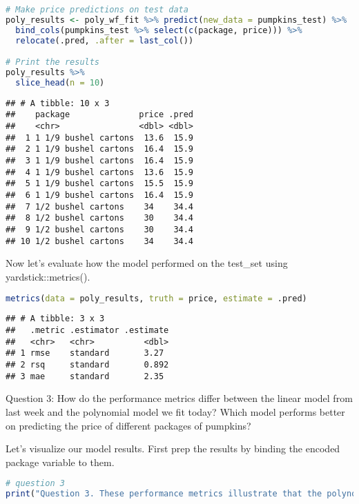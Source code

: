 \documentclass[
]{article}
\begin{document}
\begin{lstlisting}[language=R]
# Make price predictions on test data
poly_results <- poly_wf_fit %>% predict(new_data = pumpkins_test) %>% 
  bind_cols(pumpkins_test %>% select(c(package, price))) %>% 
  relocate(.pred, .after = last_col())

# Print the results
poly_results %>% 
  slice_head(n = 10)
\end{lstlisting}

\begin{lstlisting}
## # A tibble: 10 x 3
##    package              price .pred
##    <chr>                <dbl> <dbl>
##  1 1 1/9 bushel cartons  13.6  15.9
##  2 1 1/9 bushel cartons  16.4  15.9
##  3 1 1/9 bushel cartons  16.4  15.9
##  4 1 1/9 bushel cartons  13.6  15.9
##  5 1 1/9 bushel cartons  15.5  15.9
##  6 1 1/9 bushel cartons  16.4  15.9
##  7 1/2 bushel cartons    34    34.4
##  8 1/2 bushel cartons    30    34.4
##  9 1/2 bushel cartons    30    34.4
## 10 1/2 bushel cartons    34    34.4
\end{lstlisting}

Now let's evaluate how the model performed on the test\_set using
yardstick::metrics().

\begin{lstlisting}[language=R]
metrics(data = poly_results, truth = price, estimate = .pred)
\end{lstlisting}

\begin{lstlisting}
## # A tibble: 3 x 3
##   .metric .estimator .estimate
##   <chr>   <chr>          <dbl>
## 1 rmse    standard       3.27 
## 2 rsq     standard       0.892
## 3 mae     standard       2.35
\end{lstlisting}

Question 3: How do the performance metrics differ between the linear
model from last week and the polynomial model we fit today? Which model
performs better on predicting the price of different packages of
pumpkins?

Let's visualize our model results. First prep the results by binding the
encoded package variable to them.

\begin{lstlisting}[language=R]
# question 3
print("Question 3. These performance metrics illustrate that the polynomial model fits the data better than the linear model. We know this since the RMSE and MAE are approximately halved in this model compared to the last, and the R-squared is approximately doubled. In other words, with the polynomial model, our errors between what the model is predicting and what the true value is are much smaller, and the variability in our data is much better explained by the relationship of variables within this polynomial model.")
\end{lstlisting}
\end{document}
